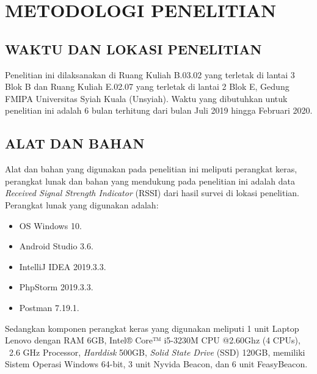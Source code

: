 \fancyhf{} 
\fancyfoot[C]{\thepage}
\chapter{METODOLOGI PENELITIAN}

\section{\uppercase{WAKTU DAN LOKASI PENELITIAN}}
\setlength\parindent{30pt} Penelitian ini dilaksanakan di Ruang Kuliah B.03.02 yang terletak di lantai 3 Blok B dan Ruang Kuliah E.02.07 yang terletak di lantai 2 Blok E, Gedung FMIPA Universitas Syiah Kuala (Unsyiah). Waktu yang dibutuhkan untuk penelitian ini adalah 6 bulan terhitung dari bulan Juli 2019 hingga Februari 2020. 

\section{\uppercase{ALAT DAN BAHAN}}
Alat dan bahan yang digunakan pada penelitian ini meliputi perangkat keras, perangkat lunak dan bahan yang mendukung pada penelitian ini adalah data \textit{Received Signal Strength Indicator} (RSSI) dari hasil survei di lokasi penelitian. Perangkat lunak yang digunakan adalah:
\begin{itemize}
\itemsep0em
\item OS Windows 10.
\item Android Studio 3.6.
\item IntelliJ IDEA 2019.3.3.
\item PhpStorm 2019.3.3.
\item Postman 7.19.1.
\end{itemize}

\par Sedangkan komponen perangkat keras yang digunakan meliputi 1 unit Laptop Lenovo dengan RAM 6GB, Intel® Core™ i5-3230M CPU @2.60Ghz (4 CPUs), ~2.6 GHz Processor, \textit{Harddisk} 500GB, \textit{Solid State Drive} (SSD) 120GB, memiliki Sistem Operasi Windows 64-bit, 3 unit Nyvida Beacon, dan 6 unit FeasyBeacon. 


